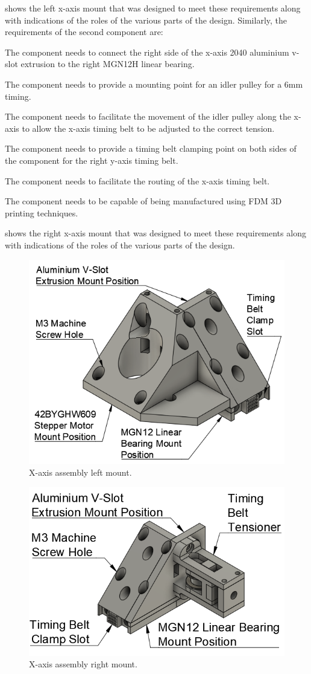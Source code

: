  shows the left x-axis mount that was designed to meet these requirements along with indications of the roles of the various parts of the design. Similarly, the requirements of the second component are:

\begin{compactitem}
	\item The component needs to connect the right side of the x-axis 2040 aluminium v-slot extrusion to the right MGN12H linear bearing.
	\item The component needs to provide a mounting point for an idler pulley for a 6mm timing.
	\item The component needs to facilitate the movement of the idler pulley along the x-axis to allow the x-axis timing belt to be adjusted to the correct tension.
	\item The component needs to provide a timing belt clamping point on both sides of the component for the right y-axis timing belt.
	\item The component needs to facilitate the routing of the x-axis timing belt.
	\item The component needs to be capable of being manufactured using \ac{FDM} 3D printing techniques.
\end{compactitem}

 shows the right x-axis mount that was designed to meet these requirements along with indications of the roles of the various parts of the design.

\begin{figure}[H]
	\centering
	\includegraphics[width=0.45\linewidth]{figures/202108/x-axis-mount-left.png}
	\caption{X-axis assembly left mount.}
	\label{fig:x-axis-mount-left}
\end{figure}

\begin{figure}[H]
	\centering
	\includegraphics[width=0.4\linewidth]{figures/202108/x-axis-mount-right.png}
	\caption{X-axis assembly right mount.}
	\label{fig:x-axis-mount-right}
\end{figure}

